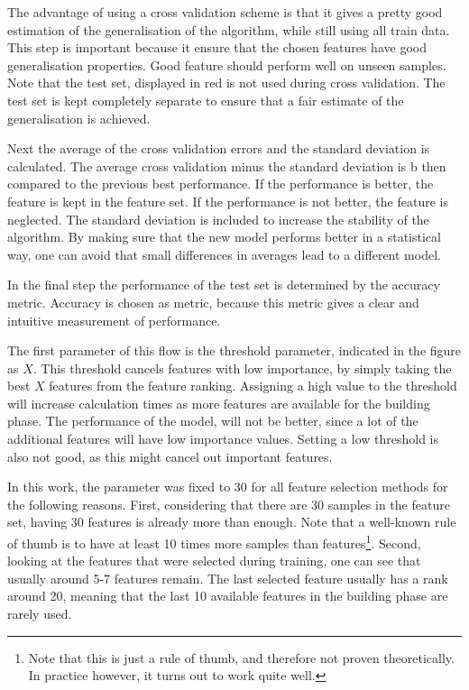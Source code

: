 
The advantage of using a cross validation scheme is that it gives a pretty good estimation of the generalisation of the algorithm, while still using all train data. This step is important because it ensure that the chosen features have good generalisation properties. Good feature should perform well on unseen samples. Note that the test set, displayed in red is not used during cross validation. The test set is kept completely separate to ensure that a fair estimate of the generalisation is achieved.

\npar

Next the average of the cross validation errors and the standard deviation is calculated. The average cross validation minus the standard deviation is b
then compared to the previous best performance. If the performance is better, the feature is kept in the feature set. If the performance is not better, the feature is neglected. The standard deviation is included to increase the stability of the algorithm. By making sure that the new model performs better in a statistical way, one can avoid that small differences in averages lead to a different model.

\npar

In the final step the performance of the test set is determined by the accuracy metric. Accuracy is chosen as metric, because this metric gives a clear and intuitive measurement of performance.

\npar

The first parameter of this flow is the threshold parameter, indicated in the figure as $X$. This threshold cancels features with low importance, by simply taking the best $X$ features from the feature ranking. Assigning a high value to the threshold will increase calculation times as more features are available for the building phase. The performance of the model, will not be better, since a lot of the additional features will have low importance values. Setting a low threshold is also not good, as this might cancel out important features. 

\npar

In this work, the parameter was fixed to 30 for all feature selection methods for the following reasons. First, considering that there are 30 samples in the feature set, having 30 features is already more than enough. Note that a well-known rule of thumb is to have at least 10 times more samples than features\citep{rot1,rot2}\footnote{Note that this is just a rule of thumb, and therefore not proven theoretically. In practice however, it turns out to work quite well.}. Second, looking at the features that were selected during training, one can see that usually around 5-7 features remain. The last selected feature usually has a rank around 20, meaning that the last 10 available features in the building phase are rarely used.

